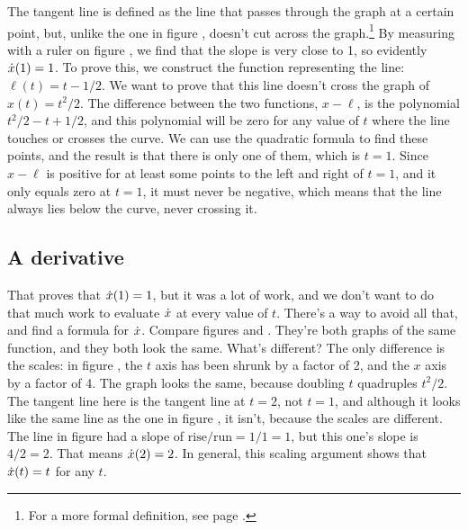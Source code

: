 %
The tangent
line is defined as the line that passes through the graph at a certain point,
but, unlike the one in figure , doesn't cut across the graph.\footnote{For a more formal definition, see
page \pageref{detour:def-tangent}.} By measuring with a ruler on figure
, we find that the slope is very close to 1, so evidently
$\dot{x}(1)=1$.
To prove this, we construct the function representing the line: $\ell(t)=t-1/2$. 
We want to prove that this line doesn't cross the graph of $x(t)=t^2/2$. The difference between the
two functions, $x-\ell$, is the polynomial $t^2/2-t+1/2$, and this polynomial will be zero for any
value of $t$ where the line touches or crosses the curve. We can use the quadratic formula
to find these points, and the result is that there is only one of them, which is $t=1$.
Since $x-\ell$ is positive for at least some points to the left and right of $t=1$, and
it only equals zero at $t=1$, it must never be negative, which means that the line
always lies below the curve, never crossing it.

\subsection{A derivative}\label{scaling}
That proves that $\dot{x}(1)=1$, but it was a lot of work, and we don't want to do
that much work to evaluate $\dot{x}$ at every value of $t$. There's a way to
avoid all that, and find a formula for $\dot{x}$. Compare figures 
and . They're both graphs of the same function, and they both look the same.
What's different? The only difference is the scales: in figure , the $t$ axis
has been shrunk by a factor of 2, and the $x$ axis by a factor of 4. The graph looks the same,
because doubling $t$ quadruples $t^2/2$. The tangent line here is the tangent line at $t=2$,
not $t=1$, and although it looks like the same line as the one in figure ,
it isn't, because the scales are different. The line in figure  had a slope
of $\text{rise}/\text{run}=1/1=1$, but this one's slope is $4/2=2$. That means $\dot{x}(2)=2$.
In general, this scaling argument shows that $\dot{x}(t)=t$ for any $t$.

